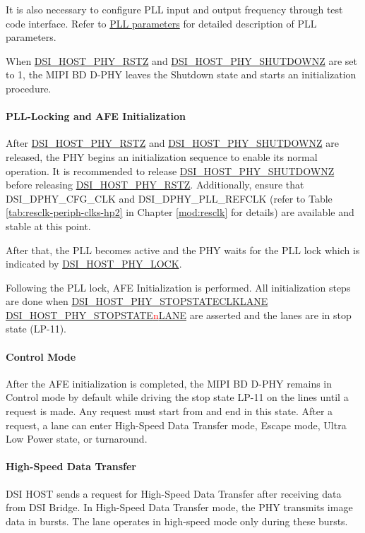 \documentclass[main\_\_EN.tex]{subfiles}
\begin{document}
It is also necessary to configure PLL input and output frequency through test code interface. Refer to \hyperref[sec:pll-parameters]{PLL parameters} for detailed description of PLL parameters.

When \hyperref[fielddesc:DSIHOSTPHYRSTZ]{DSI\_HOST\_PHY\_RSTZ} and \hyperref[fielddesc:DSIHOSTPHYSHUTDOWNZ]{DSI\_HOST\_PHY\_SHUTDOWNZ} are set to 1, the MIPI BD D-PHY leaves the Shutdown state and starts an initialization procedure.

\paragraph{PLL-Locking and AFE Initialization}
After \hyperref[fielddesc:DSIHOSTPHYRSTZ]{DSI\_HOST\_PHY\_RSTZ} and \hyperref[fielddesc:DSIHOSTPHYSHUTDOWNZ]{DSI\_HOST\_PHY\_SHUTDOWNZ} are released, the PHY begins an initialization sequence to enable its normal operation. It is recommended to release \hyperref[fielddesc:DSIHOSTPHYSHUTDOWNZ]{DSI\_HOST\_PHY\_SHUTDOWNZ} before releasing \hyperref[fielddesc:DSIHOSTPHYRSTZ]{DSI\_HOST\_PHY\_RSTZ}. Additionally, ensure that DSI\_DPHY\_CFG\_CLK and DSI\_DPHY\_PLL\_REFCLK (refer to Table \ref{tab:resclk-periph-clks-hp2} in Chapter \ref{mod:resclk} \textit{} for details) are available and stable at this point.

After that, the PLL becomes active and the PHY waits for the PLL lock which is indicated by \hyperref[fielddesc:DSIHOSTPHYLOCK]{DSI\_HOST\_PHY\_LOCK}.

Following the PLL lock, AFE Initialization is performed. All initialization steps are done when \hyperref[fielddesc:DSIHOSTPHYSTOPSTATECLKLANE]{DSI\_HOST\_PHY\_STOPSTATECLKLANE} \hyperref[fielddesc:DSIHOSTPHYSTOPSTATE0LANE]{DSI\_HOST\_PHY\_STOPSTATE\textcolor{red}{n}LANE} are asserted and the lanes are in stop state (LP-11).

\paragraph{Control Mode}
After the AFE initialization is completed, the MIPI BD D-PHY remains in Control mode by default while driving the stop state LP-11 on the lines until a request is made. Any request must start from and end in this state. After a request, a lane can enter High-Speed Data Transfer mode, Escape mode, Ultra Low Power state, or turnaround.



\paragraph{High-Speed Data Transfer}
DSI HOST sends a request for High-Speed Data Transfer after receiving data from DSI Bridge. In High-Speed Data Transfer mode, the PHY transmits image data in bursts. The lane operates in high-speed mode only during these bursts.
\end{document}
